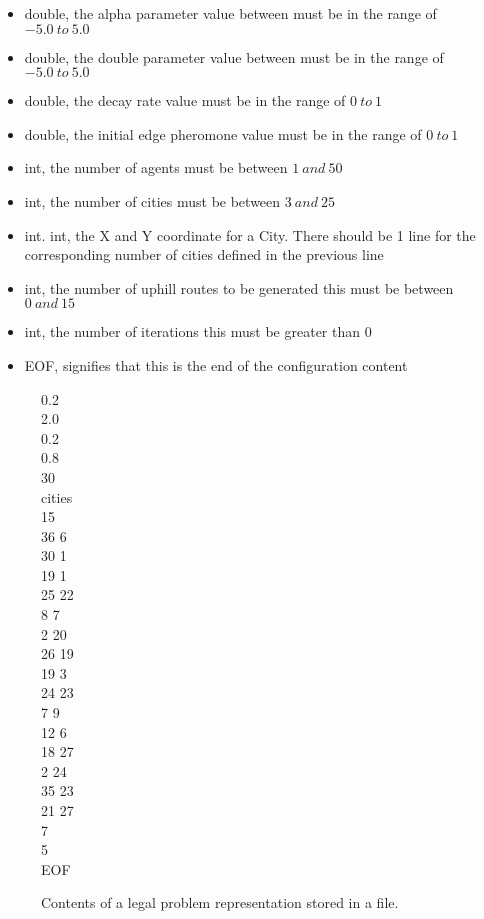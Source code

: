 \begin{itemize}
\item double, the alpha parameter value between must be in the range of $-5.0\ to\ 5.0$
\item double, the double parameter value between must be in the range of $-5.0\ to\ 5.0$
\item double, the decay rate value must be in the range of $0\ to\ 1$
\item double, the initial edge pheromone value must be in the range of $0\ to\ 1$
\item int, the number of agents must be between $1\ and\ 50$
\item int, the number of cities must be between $3\ and\ 25$
\item int. int, the X and Y coordinate for a City. There should be 1 line for the corresponding number of cities defined in the previous line
\item int, the number of uphill routes to be generated this must be between $0\ and\ 15$
\item int, the number of iterations this must be greater than $0$
\item EOF, signifies that this is the end of the configuration content
\end{itemize}

\begin{figure}[H]
0.2 \\
2.0 \\
0.2 \\
0.8 \\
30 \\
cities \\
15 \\
36 6 \\
30 1 \\
19 1 \\
25 22 \\
8 7 \\
2 20 \\
26 19 \\
19 3 \\
24 23 \\
7 9 \\
12 6 \\
18 27 \\
2 24 \\
35 23 \\
21 27 \\
7 \\
5 \\
EOF
\caption[Legal File Contents]{Contents of a legal problem representation stored in a file.}
\label{validConfig}
\end{figure}

